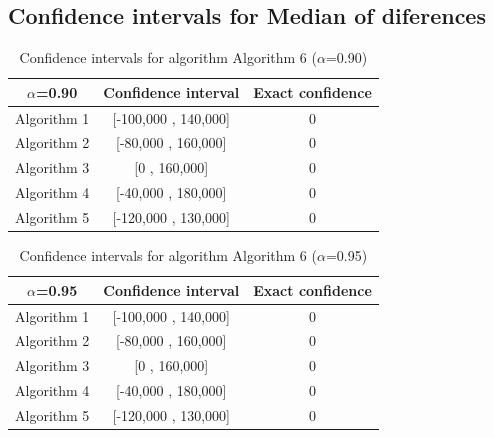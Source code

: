 \documentclass[a4paper,10pt]{article}
\begin{document}
\subsection{Confidence intervals for Median of diferences}

\begin{table}[!htp]
\centering\small
\begin{tabular}{
|c|c|c|}
\hline
 $\alpha$=0.90 & Confidence interval & Exact confidence \\ \hline 
Algorithm 1 & [-100,000 , 140,000] & 0\\ \hline 
Algorithm 2 & [-80,000 , 160,000] & 0\\ \hline 
Algorithm 3 & [0 , 160,000] & 0\\ \hline 
Algorithm 4 & [-40,000 , 180,000] & 0\\ \hline 
Algorithm 5 & [-120,000 , 130,000] & 0\\ \hline 

\end{tabular}
\caption{Confidence intervals for algorithm Algorithm 6 ($\alpha$=0.90)}
\end{table}
\begin{table}[!htp]
\centering\small
\begin{tabular}{
|c|c|c|}
\hline
 $\alpha$=0.95 & Confidence interval & Exact confidence \\ \hline 
Algorithm 1 & [-100,000 , 140,000] & 0\\ \hline 
Algorithm 2 & [-80,000 , 160,000] & 0\\ \hline 
Algorithm 3 & [0 , 160,000] & 0\\ \hline 
Algorithm 4 & [-40,000 , 180,000] & 0\\ \hline 
Algorithm 5 & [-120,000 , 130,000] & 0\\ \hline 

\end{tabular}
\caption{Confidence intervals for algorithm Algorithm 6 ($\alpha$=0.95)}
\end{table}

 \clearpage 
\end{document}
